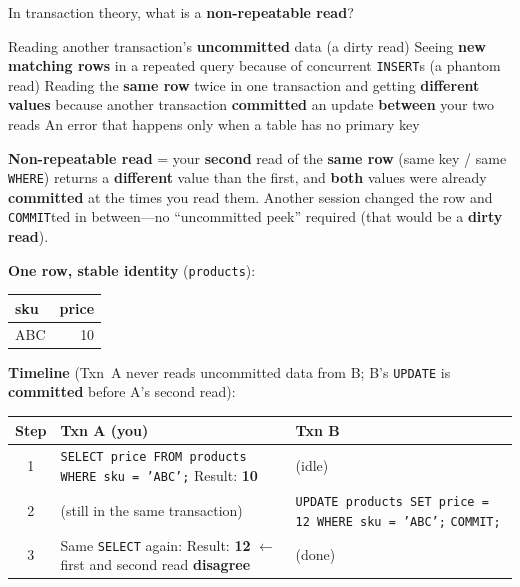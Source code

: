 \question[4]
In transaction theory, what is a \textbf{non-repeatable read}?
\begin{choices}
  \choice Reading another transaction's \textbf{uncommitted} data (a dirty read)
  \choice Seeing \textbf{new matching rows} in a repeated query because of concurrent \texttt{INSERT}s (a phantom read)
  \CorrectChoice Reading the \textbf{same row} twice in one transaction and getting \textbf{different values} because another transaction \textbf{committed} an update \textbf{between} your two reads
  \choice An error that happens only when a table has no primary key
\end{choices}
\begin{solution}
  \textbf{Non-repeatable read} = your \textbf{second} read of the \textbf{same row} (same key / same \texttt{WHERE}) returns a \textbf{different} value than the first, and \textbf{both} values were already \textbf{committed} at the times you read them. Another session changed the row and \texttt{COMMIT}ted in between---no ``uncommitted peek'' required (that would be a \textbf{dirty read}).

  \medskip
  \noindent\textbf{One row, stable identity} (\texttt{products}):

  \begin{center}
  \footnotesize
  \begin{tabular}{|l|r|}
    \hline
    \textbf{sku} & \textbf{price} \\
    \hline
    ABC & 10 \\
    \hline
  \end{tabular}
  \end{center}

  \noindent\textbf{Timeline} (Txn~A never reads uncommitted data from B; B's \texttt{UPDATE} is \textbf{committed} before A's second read):

  \begin{center}
  \footnotesize
  \renewcommand{\arraystretch}{1.12}
  \begin{tabular}{|c|p{}|p{}|}
    \hline
    \textbf{Step} & \textbf{Txn A (you)} & \textbf{Txn B} \\
    \hline
    1 &
    \texttt{SELECT price FROM products WHERE sku = 'ABC';}\newline
    Result: \textbf{10} &
    (idle) \\
    \hline
    2 &
    (still in the same transaction) &
    \texttt{UPDATE products SET price = 12 WHERE sku = 'ABC';}\newline
    \texttt{COMMIT;} \\
    \hline
    3 &
    Same \texttt{SELECT} again:\newline
    Result: \textbf{12} $\leftarrow$ first and second read \textbf{disagree} &
    (done) \\
    \hline
  \end{tabular}
  \renewcommand{\arraystretch}{1}
  \end{center}


\end{solution}
